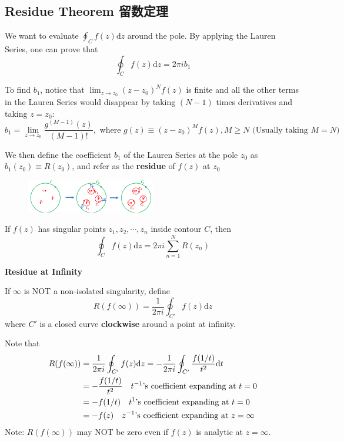 \documentclass[10pt]{article}
\newcommand{\dd}{\mathrm{d}}
\begin{document}
\subsection{Residue Theorem 留数定理}
We want to evaluate $\oint_C f(z) \dd z$ around the pole. By applying the Lauren Series, one can prove that
$$
\oint_C f(z) \dd z = 2\pi i b_1
$$

\newpage

To find $b_1$, notice that $\lim_{z\to z_0} (z-z_0)^N f(z)$ is finite and all the other terms in the Lauren Series would disappear by taking $(N-1)$ times derivatives and taking $z = z_0$:
$$
b_1 = \lim_{z\to z_0} \frac{g^{(M-1)}(z)}{(M-1)!}, \text{ where } g(z) \equiv (z-z_0)^M f(z), M\geq N \text{ (Usually taking $M=N$)}
$$

We then define the coefficient $b_1$ of the Lauren Series at the pole $z_0$ as $b_1(z_0) \equiv R(z_0)$, and refer as the \textbf{residue} of $f(z)$ at $z_0$

\begin{figure}[h]
	\centering
	\includegraphics[width=0.5\textwidth]{img3-3}
\end{figure}

If $f(z)$ has singular points $z_1, z_2, \cdots, z_n$ inside contour $C$, then
$$
\oint_C f(z)\dd z = 2\pi i \sum_{n=1}^N R(z_n)
$$

\textbf{Residue at Infinity}

If $\infty$ is NOT a non-isolated singularity, define
$$
R(f(\infty)) = \frac{1}{2\pi i} \oint_{C'} f(z) \dd z
$$
where $C'$ is a closed curve \textbf{clockwise} around a point at infinity.

Note that
$$
\begin{aligned}
	R(f(\infty)) &= \frac{1}{2\pi i} \oint_{C'} f(z) \dd z = - \frac{1}{2\pi i} \oint_{C'} \frac{f(1/t)}{t^2} \dd t\\
	&= - \frac{f(1/t)}{t^2} \text{\quad$t^{-1}$'s coefficient expanding at $t=0$}\\
	&= - f(1/t) \text{\quad$t^{1}$'s coefficient expanding at $t=0$}\\
	&= - f(z) \text{\quad$z^{-1}$'s coefficient expanding at $z=\infty$}
\end{aligned}
$$
Note: $R(f(\infty))$ may NOT be zero even if $f(z)$ is analytic at $z=\infty$.
\end{document}
